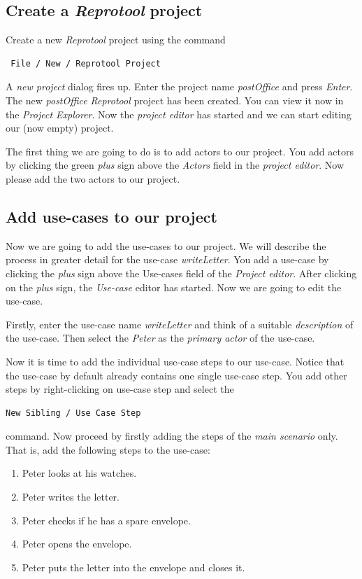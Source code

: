 \subsection{Create a \emph{Reprotool} project}
Create a new \emph{Reprotool} project using the command
\begin{verbatim}
 File / New / Reprotool Project
\end{verbatim}

A \emph{new project} dialog fires up. Enter the project name \emph{postOffice} and press \emph{Enter}. The new \emph{postOffice}
\emph{Reprotool} project has been created. You can view it now in the \emph{Project Explorer}. Now the \emph{project editor} has
started and we can start editing our (now empty) project.

The first thing we are going to do is to add actors to our project. You add actors by clicking the green \emph{plus} sign above the
\emph{Actors} field in the \emph{project editor}. Now please add the two actors to our project.

\subsection{Add use-cases to our project}
Now we are going to add the use-cases to our project. We will describe the process in greater detail for the use-case
\emph{writeLetter}. You add a use-case by clicking the \emph{plus} sign above the Use-cases field of the \emph{Project editor}.
After clicking on the \emph{plus} sign, the \emph{Use-case} editor has started. Now we are going to edit the use-case.

Firstly, enter the use-case name \emph{writeLetter} and think of a suitable \emph{description} of the use-case.
Then select the \emph{Peter} as the \emph{primary actor} of the use-case.

Now it is time to add the individual use-case steps to our use-case. Notice that the use-case by default already contains one single
use-case step. You add other steps by right-clicking on use-case step and select the
\begin{verbatim}
New Sibling / Use Case Step
\end{verbatim}
 command. Now proceed by firstly adding the steps of the \emph{main scenario} only. That is, add the following steps to the use-case:

\begin{enumerate}
 \item Peter looks at his watches.
 \item Peter writes the letter.
 \item Peter checks if he has a spare envelope.
 \item Peter opens the envelope.
 \item Peter puts the letter into the envelope and closes it.
\end{enumerate}

